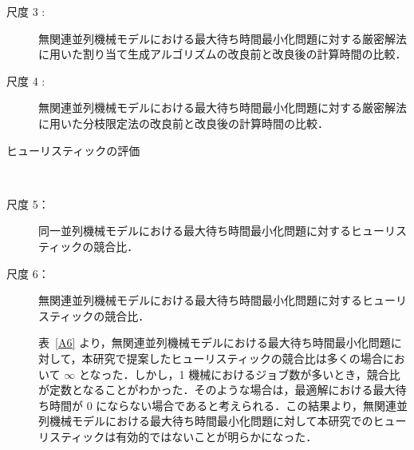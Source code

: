 \documentclass[12pt]{optlab-bachelor}
\begin{document}
\begin{description}
  \item[尺度 3 :] 無関連並列機械モデルにおける最大待ち時間最小化問題に対する厳密解法に用いた割り当て生成アルゴリズムの改良前と改良後の計算時間の比較．
\end{description}




\begin{description}
  \item[尺度 4 :] 無関連並列機械モデルにおける最大待ち時間最小化問題に対する厳密解法に用いた分枝限定法の改良前と改良後の計算時間の比較．
\end{description}


\begin{description}
  \item[ヒューリスティックの評価] ~
\end{description}

\begin{description}
  \item[尺度 5：] 同一並列機械モデルにおける最大待ち時間最小化問題に対するヒューリスティックの競合比．
\end{description}


\begin{description}
  \item[尺度 6：] 無関連並列機械モデルにおける最大待ち時間最小化問題に対するヒューリスティックの競合比．

  表~\ref{A6} より，無関連並列機械モデルにおける最大待ち時間最小化問題に対して，本研究で提案したヒューリスティックの競合比は多くの場合において $\infty$ となった．しかし，1 機械におけるジョブ数が多いとき，競合比が定数となることがわかった．そのような場合は，最適解における最大待ち時間が 0 にならない場合であると考えられる．この結果より，無関連並列機械モデルにおける最大待ち時間最小化問題に対して本研究でのヒューリスティックは有効的ではないことが明らかになった．
\end{description}
\end{document}
